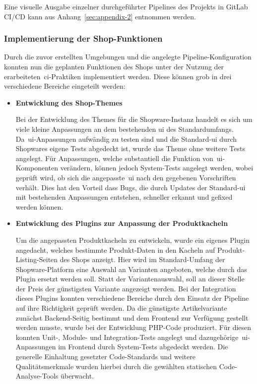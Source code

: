 Eine visuelle Ausgabe einzelner durchgeführter Pipelines des Projekts in GitLab CI/CD kann aus
Anhang\ \ref{sec:appendix-2} entnommen werden.

\subsubsection{Implementierung der Shop-Funktionen}

Durch die zuvor erstellten Umgebungen und die angelegte Pipeline-Konfiguration konnten nun die geplanten Funktionen des
Shops unter der Nutzung der erarbeiteten\ \acrshort{ci}-Praktiken implementiert werden.
Diese können grob in drei verschiedene Bereiche eingeteilt werden:

\begin{itemize}
    \item {
        \textbf{Entwicklung des Shop-Themes}\par
        Bei der Entwicklung des Themes für die Shopware-Instanz handelt es sich um viele kleine Anpassungen an dem
        bestehenden \acrfull{ui} des Standardumfangs.
        Da\ \acrshort{ui}-Anpassungen aufwändig zu testen sind und die Standard-\acrshort{ui} durch
        Shopwares eigene Tests abgedeckt ist, wurde das Theme ohne weitere Tests angelegt.
        Für Anpassungen, welche substantiell die Funktion von\ \acrshort{ui}-Komponenten verändern, können jedoch
        System-Tests angelegt werden, wobei geprüft wird, ob sich die angepasste\ \acrshort{ui} nach den gegebenen
        Vorschriften verhält.
        Dies hat den Vorteil dass Bugs, die durch Updates der Standard-\acrshort{ui} mit bestehenden Anpassungen
        entstehen, schneller erkannt und gefixed werden können.
    }

    \clearpage

    \item {
        \textbf{Entwicklung des Plugins zur Anpassung der Produktkacheln}\par
        Um die angepassten Produktkacheln zu entwickeln, wurde ein eigenes Plugin angedacht, welches bestimmte
        Produkt-Daten in den Kacheln auf Produkt-Listing-Seiten des Shops anzeigt.
        Hier wird im Standard-Umfang der Shopware-Platform eine Auswahl an Varianten angeboten, welche durch das
        Plugin ersetzt werden soll.
        Statt der Variantenauswahl, soll an dieser Stelle der Preis der günstigsten Variante angezeigt werden.
        Bei der Integration dieses Plugins konnten verschiedene Bereiche durch den Einsatz der Pipeline auf ihre
        Richtigkeit geprüft werden.
        Da die günstigste Artikelvariante zunächst Backend-Seitig bestimmt und dem Frontend zur Verfügung
        gestellt werden musste, wurde bei der Entwicklung PHP-Code produziert.
        Für diesen konnten Unit-, Module- und Integration-Tests angelegt und dazugehörige\ \acrshort{ui}-Anpassungen
        im Frontend durch System-Tests abgedeckt werden.
        Die generelle Einhaltung gesetzter Code-Standards und weitere Qualitätsmerkmale wurden hierbei durch die
        gewählten statischen Code-Analyse-Tools überwacht.
    }


\end{itemize}
